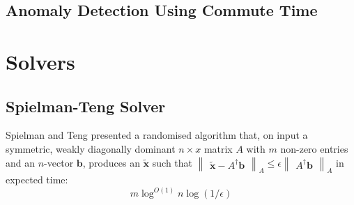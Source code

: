 \subsection{Anomaly Detection Using Commute Time}
\label{sec:commuteTime:anomalyDetection}

\section{Solvers}
\label{sec:solvers}

\subsection{Spielman-Teng Solver}
\label{sec:solvers:spielmanTengSolver}
\nocite{SPIELMANTANG09}
Spielman and Teng presented a randomised algorithm that, on input a symmetric, 
weakly diagonally dominant $n{\times}x$ matrix $A$ with $m$ non-zero entries and
an $n$-vector $\mathbf{b}$, produces an $\tilde{\mathbf{x}}$ such that 
$\begin{Vmatrix} \tilde{\textbf{x}} - A^{\dagger}\textbf{b} \end{Vmatrix}_{A} 
\leq \epsilon \begin{Vmatrix} A^{\dagger}\mathbf{b} \end{Vmatrix}_{A}$ in 
expected time:
\begin{displaymath}
m \log^{O(1)} n \log (1/\epsilon)
\end{displaymath}
